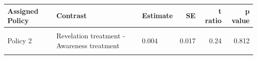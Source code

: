 \centering
\begin{tabular}[t]{lllrrr}
\toprule
Assigned Policy & Contrast & Estimate & SE & t ratio & p value\\
\midrule
\cellcolor{gray!10}{Policy 1} & \cellcolor{gray!10}{Revelation treatment - Awareness treatment} & \cellcolor{gray!10}{0.014} & \cellcolor{gray!10}{0.017} & \cellcolor{gray!10}{0.80} & \cellcolor{gray!10}{0.423}\\
Policy 2 & Revelation treatment - Awareness treatment & 0.004 & 0.017 & 0.24 & 0.812\\
\cellcolor{gray!10}{Policy 3} & \cellcolor{gray!10}{Revelation treatment - Awareness treatment} & \cellcolor{gray!10}{0.014} & \cellcolor{gray!10}{0.017} & \cellcolor{gray!10}{0.81} & \cellcolor{gray!10}{0.419}\\
\bottomrule
\end{tabular}
